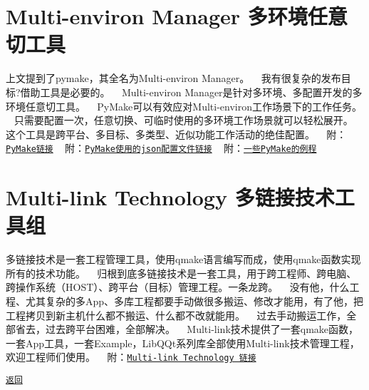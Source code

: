  \section*{Multi-\/environ Manager 多环境任意切工具}

上文提到了pymake，其全名为\+Multi-\/environ Manager。 ~\newline
我有很复杂的发布目标?借助工具是必要的。 ~\newline
Multi-\/environ Manager是针对多环境、多配置开发的多环境任意切工具。 ~\newline
Py\+Make可以有效应对\+Multi-\/environ工作场景下的工作任务。 ~\newline
只需要配置一次，任意切换、可临时使用的多环境工作场景就可以轻松展开。 ~\newline
这个工具是跨平台、多目标、多类型、近似功能工作活动的绝佳配置。 ~\newline
附：\href{https://gitee.com/drabel/PyMake}{\tt Py\+Make链接} ~\newline
附：\href{https://gitee.com/drabel/BuildConfig}{\tt Py\+Make使用的json配置文件链接} ~\newline
附：\href{https://gitee.com/drabel/BuildShell}{\tt 一些\+Py\+Make的例程} ~\newline
 \section*{Multi-\/link Technology 多链接技术工具组}

多链接技术是一套工程管理工具，使用qmake语言编写而成，使用qmake函数实现所有的技术功能。 ~\newline
归根到底多链接技术是一套工具，用于跨工程师、跨电脑、跨操作系统（\+H\+O\+S\+T）、跨平台（目标）管理工程。一条龙跨。 ~\newline
没有他，什么工程、尤其复杂的多\+App、多库工程都要手动做很多搬运、修改才能用，有了他，把工程拷贝到新主机什么都不搬运、什么都不改就能用。 ~\newline
过去手动搬运工作，全部省去，过去跨平台困难，全部解决。 ~\newline
Multi-\/link技术提供了一套qmake函数，一套\+App工具，一套\+Example，\+Lib\+Q\+Qt系列库全部使用\+Multi-\/link技术管理工程，欢迎工程师们使用。 ~\newline
附：\href{https://gitee.com/drabel/multi-link}{\tt Multi-\/link Technology 链接} ~\newline


\href{.}{\tt 返回} 